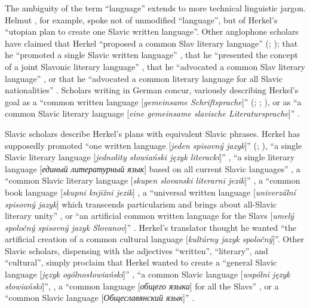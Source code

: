 The ambiguity of the term “language” extends to more technical linguistic jargon. Helmut \citet[441]{slapnicka_sprache_1974}, for example, spoke not of unmodified “language”, but of Herkel’s “utopian plan to create one Slavic written language”. Other anglophone scholars have claimed that Herkel “proposed a common Slav literary language” (\cite[254]{kohn_panslavism_1953}; \cite[36]{kirschbaum_pan-slavism_1966}); that he “promoted a single Slavic written language” \citep[116]{koch_slavism_1962}, that he “presented the concept of a joint Slavonic literary language” \citep[315]{lazari_idei_2009}, that he “advocated a common Slav literary language” \citep[21]{roucek_soviet_1953}, or that he “advocated a common literary language for all Slavic nationalities” \citep[93]{grebmeier_origins_1951}. Scholars writing in German concur, variously describing Herkel’s goal as a “common written language [\textit{gemeinsame Schriftsprache}]” (\cite[94]{hantsch_panslawismus_1965}; \cite[84]{picht_m_1969}; \cite[103]{meyer_wiederbelebung_2014}), or as “a common Slavic literary language [\textit{eine gemeinsame slavische Literatursprache}]” \citep[110]{biedermann_polen_1967}.

Slavic scholars describe Herkel’s plans with equivalent Slavic phrases. Herkel has supposedly promoted “one written language [\textit{jeden spisovný jazyk}]” (\cite[191]{rosenbaum_o_1954}; \cite[131]{vyvijalova_snahy_1960}), “a single Slavic literary language [\textit{jednolity słowiański język literacki}]” \citep[254]{chlebowczyk_procesy_1975}, “a single literary language [\textit{единый литературный язык}] based on all current Slavic languages” \citep[118]{zlidnev_formirovanie_1977}, a “common Slavic literary language [\textit{skupen slovanski literarni jezik}]” \citep[33]{zajc_panslavizem_2009}, a “common book language [\textit{skupni knjižni jezik}] \citep[69]{dolgan_vzajemni_1995}, a “universal written language [\textit{univerzální spisovný jazyk}] which transcends particularism and brings about all-Slavic literary unity” \citep[376]{sefcik_buzassyova_2010}, or “an artificial common written language for the Slavs [\textit{umelý spoločný spisovný jazyk Slovanov}]” \citep[105]{butvin_problematika_1978}. Herkel’s translator \citet[42]{buzassyova_gramaticke_2002} thought he wanted “the artificial creation of a common cultural language [\textit{kultúrny jazyk spoločný}]”. Other Slavic scholars, dispensing with the adjectives “written”, “literary”, and “cultural”, simply proclaim that Herkel wanted to create a “general Slavic language [\textit{język ogólnosłowiański}]” \citep[162]{baziur_slowacka_2016}, “a common Slavic language [\textit{wspólni język słowiański}]”, \citep[67]{kola_slowianofilstwo_2004}, a “common language [\textit{об\-щего языка}] for all the Slavs” \citep[4]{pavlenko_panslavizm_2016}, or a “common Slavic language [\textit{Общеславянский язык}]” \citep[18]{kulikovskij_ocherk_1885}.

